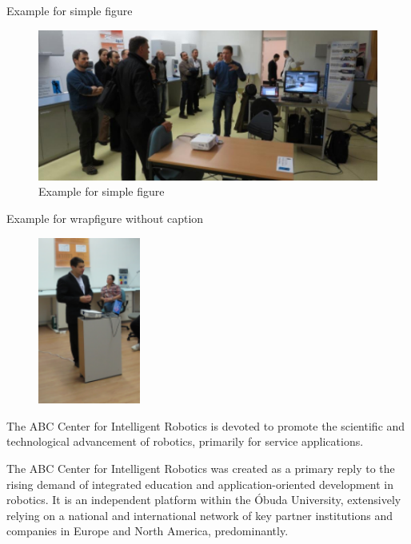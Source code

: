 \documentclass{beamer}
\begin{document}
	\begin{frame}{Example for simple figure}
		
		\begin{figure}
		\centering
		\includegraphics[width=\linewidth]{img/example_fig_1}
		\caption{Example for simple figure}
		\label{fig:example_fig_1}
		\end{figure}

	\end{frame}
	
	\begin{frame}{Example for wrapfigure without caption}
		
		\begin{figure} %
			\vspace{-20pt}
			\begin{center}
				\includegraphics[width=0.3\textwidth]{img/example_fig_2}
				\label{fig:example_fig_2}
			\end{center}
			\vspace{-20pt}
			\vspace{1pt}
		\end{figure} 
		The ABC Center for Intelligent Robotics is devoted to promote the scientific and technological advancement of robotics, primarily for service applications.
		
		\vspace*{2mm}
		
		The ABC Center for Intelligent Robotics was created as a primary reply to the rising demand of integrated education and application-oriented development in robotics. It is an independent platform within the Óbuda University, extensively relying on a national and international network of key partner institutions and companies in Europe and North America, predominantly.

	\end{frame}
	
\end{document}
